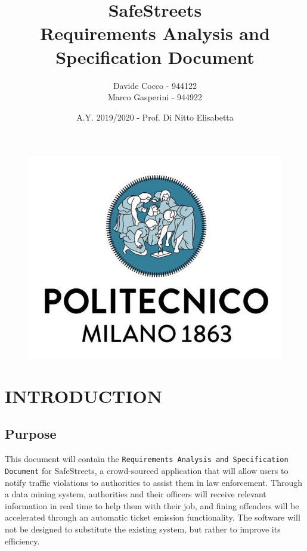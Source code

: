 \documentclass[12pt,a4paper]{article}
\author{Davide Cocco - 944122\\
	Marco Gasperini - 944922}
\date{A.Y. 2019/2020 - Prof. Di Nitto Elisabetta}
\title{
	\textbf{\Huge{SafeStreets}} \\
	\large Requirements Analysis and Specification Document
}
\begin{document}
	\begin{figure}
		\centering
		\includegraphics[width=1.0\linewidth]{Images/polimi.jpg}
	\end{figure}

	\maketitle
	\newpage
	\tableofcontents
	\newpage

\section{INTRODUCTION}
\subsection{Purpose} 
This document will contain the \texttt{Requirements Analysis and Specification Document} for SafeStreets, a crowd-sourced application that will allow users to notify traffic violations to authorities to assist them in law enforcement. Through a data mining system, authorities and their officers will receive relevant information in real time to help them with their job, and fining offenders will be accelerated through an automatic ticket emission functionality. The software will not be designed to substitute the existing system, but rather to improve its efficiency.
 
\end{document}

